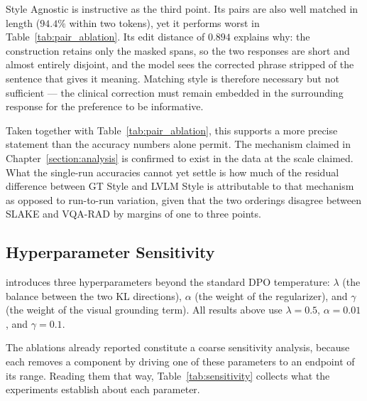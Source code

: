 Style Agnostic is instructive as the third point. Its pairs are also well matched in length ($94.4\%$ within two tokens), yet it performs worst in Table~\ref{tab:pair_ablation}. Its edit distance of $0.894$ explains why: the construction retains only the masked spans, so the two responses are short and almost entirely disjoint, and the model sees the corrected phrase stripped of the sentence that gives it meaning. Matching style is therefore necessary but not sufficient --- the clinical correction must remain embedded in the surrounding response for the preference to be informative.

Taken together with Table~\ref{tab:pair_ablation}, this supports a more precise statement than the accuracy numbers alone permit. The mechanism claimed in Chapter~\ref{section:analysis} is confirmed to exist in the data at the scale claimed. What the single-run accuracies cannot yet settle is how much of the residual difference between GT Style and LVLM Style is attributable to that mechanism as opposed to run-to-run variation, given that the two orderings disagree between SLAKE and VQA-RAD by margins of one to three points.

\subsection{Hyperparameter Sensitivity}
\label{sec:res:sensitivity}

\ourloss{} introduces three hyperparameters beyond the standard DPO temperature: $\lambda$ (the balance between the two KL directions), $\alpha$ (the weight of the regularizer), and $\gamma$ (the weight of the visual grounding term). All results above use $\lambda = 0.5$, $\alpha = 0.01$, and $\gamma = 0.1$.

The ablations already reported constitute a coarse sensitivity analysis, because each removes a component by driving one of these parameters to an endpoint of its range. Reading them that way, Table~\ref{tab:sensitivity} collects what the experiments establish about each parameter.


